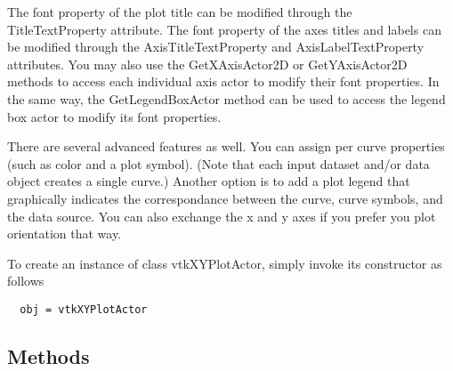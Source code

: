  The font property of the plot title can be modified through the 
 TitleTextProperty attribute.
 The font property of the axes titles and labels can be modified through the
 AxisTitleTextProperty and AxisLabelTextProperty attributes. You may also
 use the GetXAxisActor2D or GetYAxisActor2D methods 
 to access each individual axis actor to modify their font properties.
 In the same way, the GetLegendBoxActor method can be used to access
 the legend box actor to modify its font properties.

 There are several advanced features as well. You can assign per curve 
 properties (such as color and a plot symbol). (Note that each input 
 dataset and/or data object creates a single curve.) Another option is to
 add a plot legend that graphically indicates the correspondance between
 the curve, curve symbols, and the data source. You can also exchange the
 x and y axes if you prefer you plot orientation that way.

To create an instance of class vtkXYPlotActor, simply
invoke its constructor as follows
\begin{verbatim}
  obj = vtkXYPlotActor
\end{verbatim}
\subsection{Methods}

